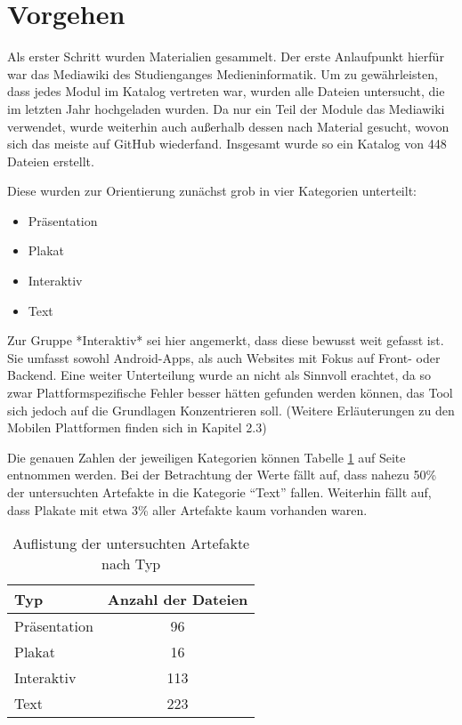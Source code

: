 
\section{Vorgehen}
Als erster Schritt wurden Materialien gesammelt. Der erste Anlaufpunkt hierfür war das Mediawiki des Studienganges Medieninformatik. Um zu gewährleisten, dass jedes Modul im Katalog vertreten war, wurden alle Dateien untersucht, die im letzten Jahr hochgeladen wurden.
Da nur ein Teil der Module das Mediawiki verwendet, wurde weiterhin auch außerhalb dessen nach Material gesucht, wovon sich das meiste auf GitHub wiederfand.
Insgesamt wurde so ein Katalog von 448 Dateien erstellt.

Diese wurden zur Orientierung zunächst grob in vier Kategorien unterteilt:

\begin{itemize}
  \item Präsentation
  \item Plakat
  \item Interaktiv
  \item Text
\end{itemize}

Zur Gruppe *Interaktiv* sei hier angemerkt, dass diese bewusst weit gefasst ist. Sie umfasst sowohl Android-Apps, als auch Websites mit Fokus auf Front- oder Backend.
Eine weiter Unterteilung wurde an nicht als Sinnvoll erachtet, da so zwar Plattformspezifische Fehler besser hätten gefunden werden können, das Tool sich jedoch auf die Grundlagen Konzentrieren soll. (Weitere Erläuterungen zu den Mobilen Plattformen finden sich in Kapitel 2.3)

Die genauen Zahlen der jeweiligen Kategorien können Tabelle \ref{table:types} auf Seite \pageref{table:types} entnommen werden. Bei der Betrachtung der Werte fällt auf, dass nahezu 50\% der untersuchten Artefakte in die Kategorie “Text” fallen. Weiterhin fällt auf, dass Plakate mit etwa 3\% aller Artefakte kaum vorhanden waren.

\begin{table}[]
\centering
\begin{tabular}{|l|c|}
\hline
\textbf{Typ} & \multicolumn{1}{l|}{\textbf{Anzahl der Dateien}} \\ \hline
Präsentation & 96                                               \\ \hline
Plakat       & 16                                               \\ \hline
Interaktiv   & 113                                              \\ \hline
Text         & 223                                              \\ \hline
\end{tabular}
\caption{Auflistung der untersuchten Artefakte nach Typ}
\label{table:types}
\end{table}

